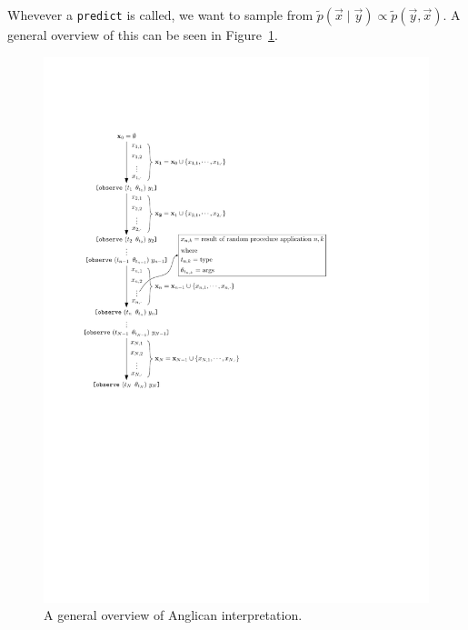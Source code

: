 Whevever a \verb!predict! is called, we want to sample from $\tilde p(\vec x \mid \vec y) \propto \tilde p(\vec y, \vec x)$. A general overview of this can be seen in Figure~\ref{fig:pprog/how/general}.
\begin{figure}[!htb]
\centering
\includegraphics[scale=1]{pprog/how/figures/general/general}
\caption{A general overview of Anglican interpretation.}
\label{fig:pprog/how/general}
\end{figure}



